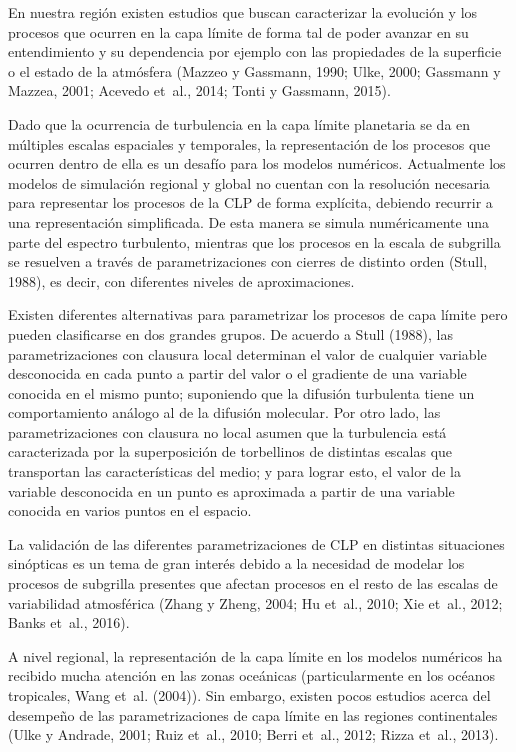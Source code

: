 \documentclass[12pt,spanish,oneside, a4paper]{book}
\begin{document}
En nuestra región existen estudios que buscan caracterizar la evolución
y los procesos que ocurren en la capa límite de forma tal de poder
avanzar en su entendimiento y su dependencia por ejemplo con las
propiedades de la superficie o el estado de la atmósfera (Mazzeo y
Gassmann, 1990; Ulke, 2000; Gassmann y Mazzea, 2001; Acevedo et~al.,
2014; Tonti y Gassmann, 2015).

Dado que la ocurrencia de turbulencia en la capa límite planetaria se da
en múltiples escalas espaciales y temporales, la representación de los
procesos que ocurren dentro de ella es un desafío para los modelos
numéricos. Actualmente los modelos de simulación regional y global no
cuentan con la resolución necesaria para representar los procesos de la
CLP de forma explícita, debiendo recurrir a una representación
simplificada. De esta manera se simula numéricamente una parte del
espectro turbulento, mientras que los procesos en la escala de subgrilla
se resuelven a través de parametrizaciones con cierres de distinto orden
(Stull, 1988), es decir, con diferentes niveles de aproximaciones.

Existen diferentes alternativas para parametrizar los procesos de capa
límite pero pueden clasificarse en dos grandes grupos. De acuerdo a
Stull (1988), las parametrizaciones con clausura local determinan el
valor de cualquier variable desconocida en cada punto a partir del valor
o el gradiente de una variable conocida en el mismo punto; suponiendo
que la difusión turbulenta tiene un comportamiento análogo al de la
difusión molecular. Por otro lado, las parametrizaciones con clausura no
local asumen que la turbulencia está caracterizada por la superposición
de torbellinos de distintas escalas que transportan las características
del medio; y para lograr esto, el valor de la variable desconocida en un
punto es aproximada a partir de una variable conocida en varios puntos
en el espacio.

La validación de las diferentes parametrizaciones de CLP en distintas
situaciones sinópticas es un tema de gran interés debido a la necesidad
de modelar los procesos de subgrilla presentes que afectan procesos en
el resto de las escalas de variabilidad atmosférica (Zhang y Zheng,
2004; Hu et~al., 2010; Xie et~al., 2012; Banks et~al., 2016).

A nivel regional, la representación de la capa límite en los modelos
numéricos ha recibido mucha atención en las zonas oceánicas
(particularmente en los océanos tropicales, Wang et~al. (2004)). Sin
embargo, existen pocos estudios acerca del desempeño de las
parametrizaciones de capa límite en las regiones continentales (Ulke y
Andrade, 2001; Ruiz et~al., 2010; Berri et~al., 2012; Rizza et~al.,
2013).
\end{document}
